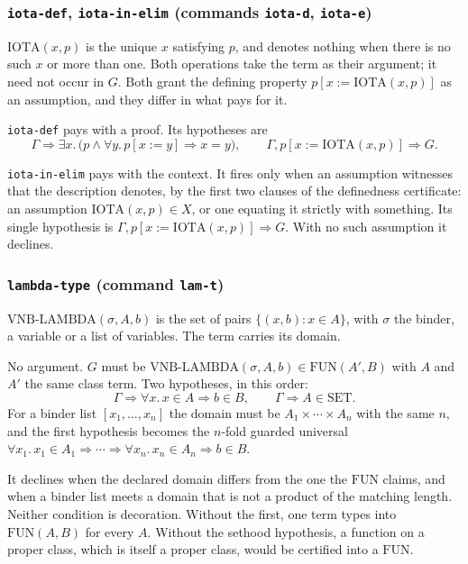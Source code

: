 \subsubsection*{\texttt{iota-def}, \texttt{iota-in-elim}
  (commands \texttt{iota-d}, \texttt{iota-e})}

$\mathrm{IOTA}(x, p)$ is the unique $x$ satisfying $p$, and denotes
nothing when there is no such $x$ or more than one.  Both operations take
the term as their argument; it need not occur in $G$.  Both grant the
defining property $p[x{:=}\mathrm{IOTA}(x,p)]$ as an assumption, and they
differ in what pays for it.

\texttt{iota-def} pays with a proof.  Its hypotheses are
\[
  \Gamma \Longrightarrow
    \exists x.\, \bigl(p \wedge \forall y.\, p[x{:=}y] \Rightarrow x = y\bigr),
  \qquad
  \Gamma, p[x{:=}\mathrm{IOTA}(x,p)] \Longrightarrow G .
\]

\texttt{iota-in-elim} pays with the context.  It fires only when an
assumption witnesses that the description denotes, by the first two
clauses of the definedness certificate: an assumption
$\mathrm{IOTA}(x,p) \in X$, or one equating it strictly with something.
Its single hypothesis is
$\Gamma, p[x{:=}\mathrm{IOTA}(x,p)] \Longrightarrow G$.  With no such
assumption it declines.

\subsubsection*{\texttt{lambda-type} (command \texttt{lam-t})}

$\mathrm{VNB\text{-}LAMBDA}(\sigma, A, b)$ is the set of pairs
$\{(x, b) : x \in A\}$, with $\sigma$ the binder, a variable or a list of
variables.  The term carries its domain.

No argument.  $G$ must be
$\mathrm{VNB\text{-}LAMBDA}(\sigma, A, b) \in \mathrm{FUN}(A', B)$ with
$A$ and $A'$ the same class term.  Two hypotheses, in this order:
\[
  \Gamma \Longrightarrow \forall x.\, x \in A \Rightarrow b \in B,
  \qquad
  \Gamma \Longrightarrow A \in \mathrm{SET} .
\]
For a binder list $[x_1, \ldots, x_n]$ the domain must be
$A_1 \times \cdots \times A_n$ with the same $n$, and the first
hypothesis becomes the $n$-fold guarded universal
$\forall x_1.\, x_1 \in A_1 \Rightarrow \cdots \Rightarrow
 \forall x_n.\, x_n \in A_n \Rightarrow b \in B$.

It declines when the declared domain differs from the one the
$\mathrm{FUN}$ claims, and when a binder list meets a domain that is not
a product of the matching length.  Neither condition is decoration.
Without the first, one term types into $\mathrm{FUN}(A, B)$ for every
$A$.  Without the sethood hypothesis, a function on a proper class, which
is itself a proper class, would be certified into a $\mathrm{FUN}$.

